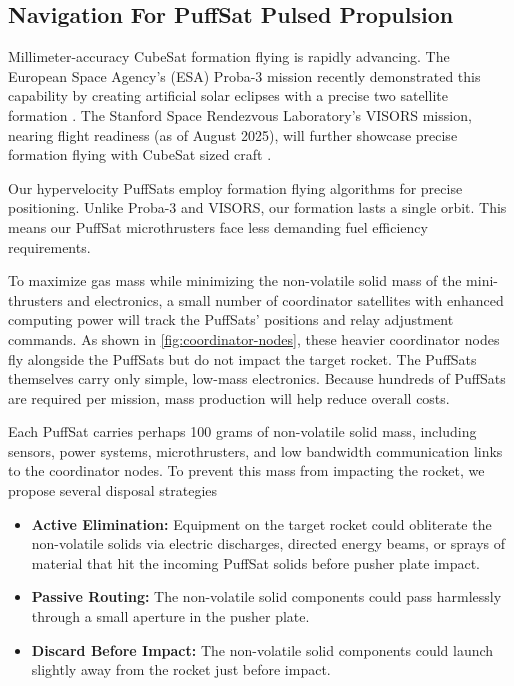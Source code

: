 \documentclass{article}
\begin{document}
\subsection{Navigation For PuffSat Pulsed Propulsion}\label{sec:neural_navigation}
Millimeter-accuracy CubeSat formation flying is rapidly advancing. The European Space Agency's (ESA) Proba-3 mission recently demonstrated this capability by creating artificial solar eclipses with a precise two satellite formation \cite{esa_proba_3}. The Stanford Space Rendezvous Laboratory's VISORS mission, nearing flight readiness (as of August 2025), will further showcase precise formation flying with CubeSat sized craft \cite{guffanti2023autonomous}.  

Our hypervelocity PuffSats employ formation flying algorithms for precise positioning.  Unlike Proba-3 and VISORS, our formation lasts a single orbit. This means our PuffSat microthrusters face less demanding fuel efficiency requirements.

To maximize gas mass while minimizing the non-volatile solid mass of the mini-thrusters and electronics, a small number of coordinator satellites with enhanced computing power will track the PuffSats' positions and relay adjustment commands. As shown in \autoref{fig:coordinator-nodes}, these heavier coordinator nodes fly alongside the PuffSats but do not impact the target rocket. The PuffSats themselves carry only simple, low-mass electronics. Because hundreds of PuffSats are required per mission, mass production will help reduce overall costs.

Each PuffSat carries perhaps 100 grams of non-volatile solid mass, including sensors, power systems, microthrusters, and low bandwidth communication links to the coordinator nodes. To prevent this mass from impacting the rocket, we propose several disposal strategies
\begin{itemize}
    \item \textbf{Active Elimination:} Equipment on the target rocket could obliterate the non-volatile solids via electric discharges, directed energy beams, or sprays of material that hit the incoming PuffSat solids before pusher plate impact.
    \item \textbf{Passive Routing:} The non-volatile solid components could pass harmlessly through a small aperture in the pusher plate.
    \item \textbf{Discard Before Impact:}  The non-volatile solid components could launch slightly away from the rocket just before impact. \label{item:discard_before_impact}
\end{itemize} 
\end{document}

